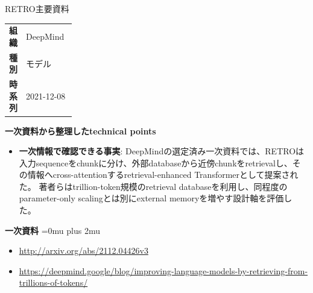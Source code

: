 \begin{technicalnote}{RETRO}{主要資料}
\begingroup
\begin{tabularx}{\linewidth}{@{}>{\bfseries}p{0.22\linewidth}X@{}}
組織 & DeepMind \\
種別 & モデル \\
時系列 & 2021-12-08 \\
\end{tabularx}
\smallskip
\begin{minipage}{\linewidth}
{\bfseries 一次資料から整理したtechnical points}
\begin{itemize}[leftmargin=1.5em,itemsep=0.35em]
\item \textbf{一次情報で確認できる事実}: DeepMindの選定済み一次資料では、RETROは入力sequenceをchunkに分け、外部databaseから近傍chunkをretrievalし、その情報へcross-attentionするretrieval-enhanced Transformerとして提案された。 著者らはtrillion-token規模のretrieval databaseを利用し、同程度のparameter-only scalingとは別にexternal memoryを増やす設計軸を評価した。
\end{itemize}
\begin{minipage}{\linewidth}
\begin{samepage}
{\bfseries 一次資料}
\begingroup\sloppy
\Urlmuskip=0mu plus 2mu\relax
\begin{itemize}[leftmargin=1.5em,itemsep=0.25em]
\item {\scriptsize\url{http://arxiv.org/abs/2112.04426v3}}
\item {\scriptsize\url{https://deepmind.google/blog/improving-language-models-by-retrieving-from-trillions-of-tokens/}}
\end{itemize}
\endgroup
\end{samepage}
\end{minipage}
\end{minipage}
\endgroup
\end{technicalnote}
\medskip

